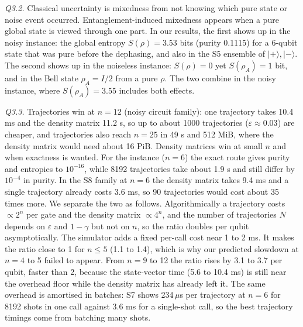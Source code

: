 \documentclass[10pt]{article}
\newcommand{\lab}[1]{\noindent\textit{#1}\;}
\begin{document}
\lab{Q3.2.} Classical uncertainty is mixedness from not knowing which pure state or noise event occurred. Entanglement-induced mixedness appears when a pure global state is viewed through one part. In our results, the first shows up in the noisy instance: the global entropy $S(\rho)=3.53$ bits (purity 0.1115) for a 6-qubit state that was pure before the dephasing, and also in the S5 ensemble of $|+\rangle,|-\rangle$. The second shows up in the noiseless instance: $S(\rho)=0$ yet $S(\rho_A)=1$ bit, and in the Bell state $\rho_A=I/2$ from a pure $\rho$. The two combine in the noisy instance, where $S(\rho_A)=3.55$ includes both effects.

\lab{Q3.3.} Trajectories win at $n=12$ (noisy circuit family): one trajectory takes 10.4 ms and the density matrix 11.2 s, so up to about 1000 trajectories ($\varepsilon\approx0.03$) are cheaper, and trajectories also reach $n=25$ in 49 s and 512 MiB, where the density matrix would need about 16 PiB. Density matrices win at small $n$ and when exactness is wanted. For the instance ($n=6$) the exact route gives purity and entropies to $10^{-16}$, while 8192 trajectories take about 1.9 s and still differ by $10^{-4}$ in purity. In the S8 family at $n=6$ the density matrix takes 9.4 ms and a single trajectory already costs 3.6 ms, so 90 trajectories would cost about 35 times more. We separate the two as follows. Algorithmically a trajectory costs $\propto2^n$ per gate and the density matrix $\propto4^n$, and the number of trajectories $N$ depends on $\varepsilon$ and $1-\gamma$ but not on $n$, so the ratio doubles per qubit asymptotically. The simulator adds a fixed per-call cost near 1 to 2 ms. It makes the ratio close to 1 for $n\le5$ (1.1 to 1.4), which is why our predicted slowdown at $n=4$ to 5 failed to appear. From $n=9$ to 12 the ratio rises by 3.1 to 3.7 per qubit, faster than 2, because the state-vector time (5.6 to 10.4 ms) is still near the overhead floor while the density matrix has already left it. The same overhead is amortised in batches: S7 shows 234\,$\mu$s per trajectory at $n=6$ for 8192 shots in one call against 3.6 ms for a single-shot call, so the best trajectory timings come from batching many shots.
\end{document}
